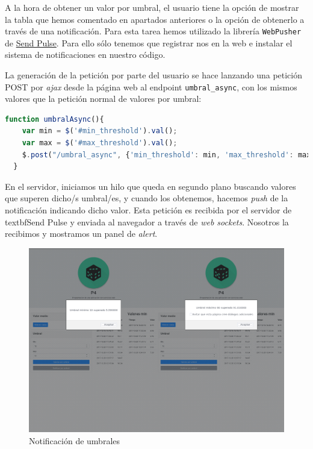 \documentclass{article}
\begin{document}
A la hora de obtener un valor por umbral, el usuario tiene la opción de mostrar la tabla que hemos comentado en apartados anteriores o la opción de obtenerlo a través de una notificación. Para esta tarea hemos utilizado la librería \texttt{WebPusher} de \href{https://sendpulse.com/}{Send Pulse}. Para ello sólo tenemos que registrar nos en la web e instalar el sistema de notificaciones en nuestro código.

La generación de la petición por parte del usuario se hace lanzando una petición POST por \emph{ajax} desde la página web al endpoint \texttt{\/umbral\_async}, con los mismos valores que la petición normal de valores por umbral:

\begin{lstlisting}[language=js]
  function umbralAsync(){
    var min = $('#min_threshold').val();
    var max = $('#max_threshold').val();
    $.post("/umbral_async", {'min_threshold': min, 'max_threshold': max});
  }

\end{lstlisting}


En el servidor, iniciamos un hilo que queda en segundo plano buscando valores que superen dicho/s umbral/es, y cuando los obtenemos, hacemos \emph{push} de la notificación indicando dicho valor. Esta petición es recibida por el servidor de \\textbf{Send Pulse} y enviada al navegador a través de \emph{web sockets}. Nosotros la recibimos y mostramos un panel de \emph{alert}.


\begin{figure}
\centering
\includegraphics[width=\textwidth]{umbrales.png}
\caption{Notificación de umbrales}
\end{figure}
\end{document}
